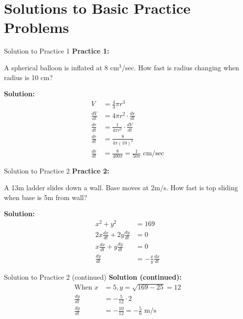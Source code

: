 \documentclass[aspectratio=169]{beamer}
\begin{document}
\section{Solutions to Basic Practice Problems}

\begin{frame}{Solution to Practice 1}
\textbf{Practice 1:}

A spherical balloon is inflated at 8 cm$^3$/sec. How fast is radius changing when radius is 10 cm?

\textbf{Solution:}
\[
\begin{aligned}
  V &= \frac{4}{3}\pi r^3 \\
  \frac{dV}{dt} &= 4\pi r^2 \cdot \frac{dr}{dt} \\
  \frac{dr}{dt} &= \frac{1}{4\pi r^2} \cdot \frac{dV}{dt} \\
  \frac{dr}{dt} &= \frac{8}{4\pi (10)^2} \\
  \frac{dr}{dt} &= \frac{8}{400\pi} = \frac{1}{50\pi} \text{ cm/sec}
\end{aligned}
\]
\end{frame}

\begin{frame}{Solution to Practice 2}
\textbf{Practice 2:}

A 13m ladder slides down a wall. Base moves at 2m/s. How fast is top sliding when base is 5m from wall?

\textbf{Solution:}
\[
\begin{aligned}
  x^2 + y^2 &= 169 \\
  2x\frac{dx}{dt} + 2y\frac{dy}{dt} &= 0 \\
  x\frac{dx}{dt} + y\frac{dy}{dt} &= 0 \\
  \frac{dy}{dt} &= -\frac{x}{y}\frac{dx}{dt}
\end{aligned}
\]
\end{frame}

\begin{frame}{Solution to Practice 2 (continued)}
\textbf{Solution (continued):}
\[
\begin{aligned}
  \text{When } x &= 5, y = \sqrt{169 - 25} = 12 \\
  \frac{dy}{dt} &= -\frac{5}{12} \cdot 2 \\
  \frac{dy}{dt} &= -\frac{10}{12} = -\frac{5}{6} \text{ m/s}
\end{aligned}
\]
\end{frame}
\end{document}
